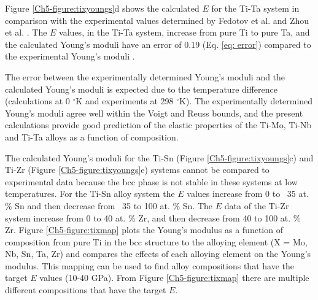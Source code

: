 Figure \ref{Ch5-figure:tixyoungs}d shows the calculated $E$ for the Ti-Ta system in comparison with the experimental values determined by Fedotov et al. \cite{Fedotov1985} and Zhou et al. \cite{Zhou2004a,Zhou2009a}. The $E$ values, in the Ti-Ta system, increase from pure Ti to pure Ta, and the calculated Young's moduli have an error of 0.19 (Eq. \ref{eq: error}) compared to the experimental Young's moduli \cite{Fedotov1985,Zhou2004a,Zhou2009a}.  

The error between the experimentally determined Young's moduli and the calculated Young's moduli is expected due to the temperature difference (calculations at 0 $^\circ$K and experiments at 298 $^\circ$K). The experimentally determined Young's moduli agree well within the Voigt and Reuss bounds, and the present calculations provide good prediction of the elastic properties of the Ti-Mo, Ti-Nb and Ti-Ta alloys as a function of composition.

The calculated Young's moduli for the Ti-Sn (Figure \ref{Ch5-figure:tixyoungs}c) and Ti-Zr (Figure \ref{Ch5-figure:tixyoungs}e) systems cannot be compared to experimental data because the bcc phase is not stable in these systems at low temperatures. For the Ti-Sn alloy system the $E$ values increase from 0 to ~35 at. \% Sn and then decrease from ~35 to 100 at. \% Sn. The $E$ data of the Ti-Zr system increase from 0 to 40 at. \% Zr, and then decrease from 40 to 100 at. \% Zr. Figure \ref{Ch5-figure:tixmap} plots the Young's modulus as a function of composition from pure Ti in the bcc structure to the alloying element (X = Mo, Nb, Sn, Ta, Zr) and compares the effects of each alloying element on the Young's modulus. This mapping can be used to find alloy compositions that have the target $E$ values (10-40 GPa). From Figure \ref{Ch5-figure:tixmap}  there are multiple different compositions that have the target $E$.

